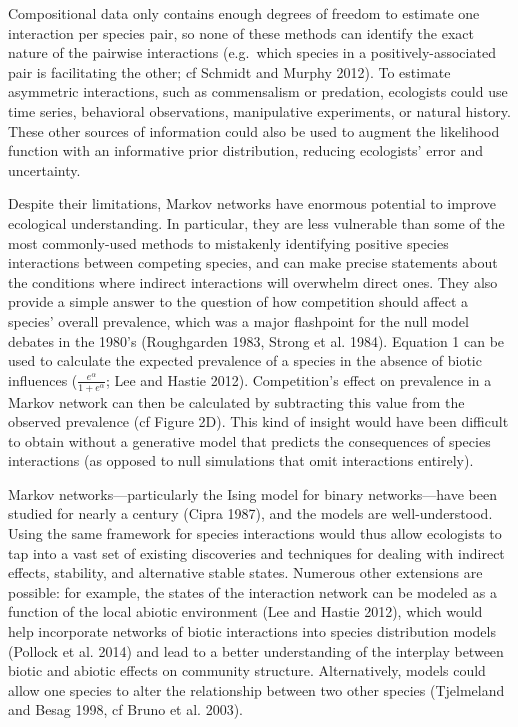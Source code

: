 \documentclass[12pt,]{article}
\begin{document}
\begin{spacing}{1.9}
\begin{flushleft}
Compositional data only contains enough degrees of freedom to estimate
one interaction per species pair, so none of these methods can identify
the exact nature of the pairwise interactions (e.g.~which species in a
positively-associated pair is facilitating the other; cf Schmidt and
Murphy 2012). To estimate asymmetric interactions, such as commensalism
or predation, ecologists could use time series, behavioral observations,
manipulative experiments, or natural history. These other sources of
information could also be used to augment the likelihood function with
an informative prior distribution, reducing ecologists' error and
uncertainty.

Despite their limitations, Markov networks have enormous potential to
improve ecological understanding. In particular, they are less
vulnerable than some of the most commonly-used methods to mistakenly
identifying positive species interactions between competing species, and
can make precise statements about the conditions where indirect
interactions will overwhelm direct ones. They also provide a simple
answer to the question of how competition should affect a species'
overall prevalence, which was a major flashpoint for the null model
debates in the 1980's (Roughgarden 1983, Strong et al. 1984). Equation 1
can be used to calculate the expected prevalence of a species in the
absence of biotic influences (\(\frac{e^\alpha}{1 + e^{\alpha}}\); Lee
and Hastie 2012). Competition's effect on prevalence in a Markov network
can then be calculated by subtracting this value from the observed
prevalence (cf Figure 2D). This kind of insight would have been
difficult to obtain without a generative model that predicts the
consequences of species interactions (as opposed to null simulations
that omit interactions entirely).

Markov networks---particularly the Ising model for binary
networks---have been studied for nearly a century (Cipra 1987), and the
models are well-understood. Using the same framework for species
interactions would thus allow ecologists to tap into a vast set of
existing discoveries and techniques for dealing with indirect effects,
stability, and alternative stable states. Numerous other extensions are
possible: for example, the states of the interaction network can be
modeled as a function of the local abiotic environment (Lee and Hastie
2012), which would help incorporate networks of biotic interactions into
species distribution models (Pollock et al. 2014) and lead to a better
understanding of the interplay between biotic and abiotic effects on
community structure. Alternatively, models could allow one species to
alter the relationship between two other species (Tjelmeland and Besag
1998, cf Bruno et al. 2003).


\end{flushleft}
\end{spacing}
\end{document}
